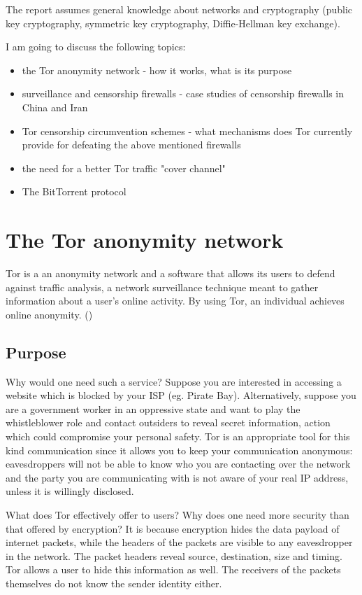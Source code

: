 \documentclass[11pt]{book} %
\begin{document}
The report assumes general knowledge about networks and cryptography (public key cryptography, symmetric key cryptography, Diffie-Hellman key exchange).

I am going to discuss the following topics:

\begin{itemize}
\item the Tor anonymity network - how it works, what is its purpose
\item surveillance and censorship firewalls - case studies of censorship firewalls in China and Iran 
\item Tor censorship circumvention schemes - what mechanisms does Tor currently provide for defeating the above mentioned firewalls
\item the need for a better Tor traffic "cover channel"
\item The BitTorrent protocol
\end{itemize}

\section{The Tor anonymity network}
Tor is a an anonymity network and a software that allows its users to defend against traffic analysis, a network surveillance technique meant to gather information about a user’s online activity. By using Tor, an individual achieves online anonymity. (\citep*{web:torOverview})

\subsection{Purpose}
Why would one need such a service? Suppose you are interested in accessing a website which is blocked by your ISP (eg. Pirate Bay). Alternatively, suppose you are a government worker in an oppressive state and want to play the whistleblower role and contact outsiders to reveal secret information, action which could compromise your personal safety. Tor is an appropriate tool for this kind communication since it allows you to keep your communication anonymous: eavesdroppers will not be able to know who you are contacting over the network and the party you are communicating with is not aware of your real IP address, unless it is willingly disclosed.

What does Tor effectively offer to users? Why does one need more security than that offered by encryption? It is because encryption hides the data payload of internet packets, while the headers of the packets are visible to any eavesdropper in the network. The packet headers reveal source, destination, size and timing. Tor allows a user to hide this information as well. The receivers of the packets themselves do not know the sender identity either.
\end{document}
